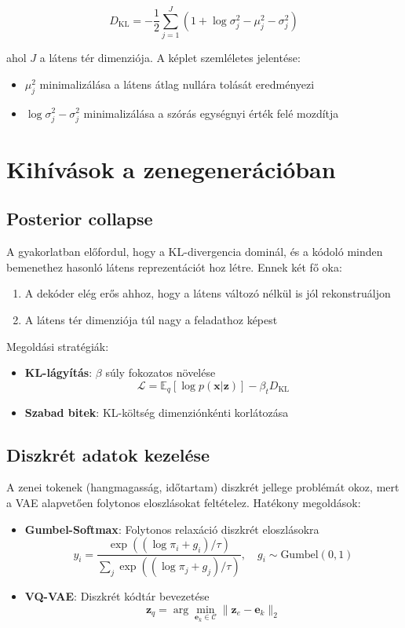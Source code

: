 \[
D_{\text{KL}} = -\frac{1}{2} \sum_{j=1}^J \left(1 + \log\sigma_j^2 - \mu_j^2 - \sigma_j^2\right)
\]

ahol $J$ a látens tér dimenziója. A képlet szemléletes jelentése: 
\begin{itemize}
    \item $\mu_j^2$ minimalizálása a látens átlag nullára tolását eredményezi
    \item $\log\sigma_j^2 - \sigma_j^2$ minimalizálása a szórás egységnyi érték felé mozdítja
\end{itemize}

\section{Kihívások a zenegenerációban}
\subsection{Posterior collapse}
A gyakorlatban előfordul, hogy a KL-divergencia dominál, és a kódoló minden bemenethez hasonló látens reprezentációt hoz létre. Ennek két fő oka:
\begin{enumerate}
    \item A dekóder elég erős ahhoz, hogy a látens változó nélkül is jól rekonstruáljon
    \item A látens tér dimenziója túl nagy a feladathoz képest
\end{enumerate}

Megoldási stratégiák:
\begin{itemize}
    \item \textbf{KL-lágyítás}: $\beta$ súly fokozatos növelése
    \[
    \mathcal{L} = \mathbb{E}_{q}[\log p(\mathbf{x}|\mathbf{z})] - \beta_t D_{\text{KL}}
    \]
    \item \textbf{Szabad bitek}: KL-költség dimenziónkénti korlátozása
\end{itemize}

\subsection{Diszkrét adatok kezelése}
A zenei tokenek (hangmagasság, időtartam) diszkrét jellege problémát okoz, mert a VAE alapvetően folytonos eloszlásokat feltételez. Hatékony megoldások:

\begin{itemize}
    \item \textbf{Gumbel-Softmax}: Folytonos relaxáció diszkrét eloszlásokra
    \[
    y_i = \frac{\exp((\log\pi_i + g_i)/\tau)}{\sum_j \exp((\log\pi_j + g_j)/\tau)}, \quad g_i \sim \text{Gumbel}(0,1)
    \]
    \item \textbf{VQ-VAE}: Diszkrét kódtár bevezetése
    \[
    \mathbf{z}_q = \arg\min_{\mathbf{e}_k \in \mathcal{C}} \|\mathbf{z}_e - \mathbf{e}_k\|_2
    \]
\end{itemize}

